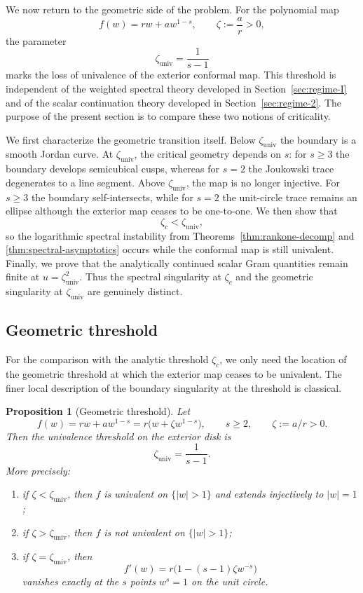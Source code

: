 \documentclass[11pt]{amsart}
\numberwithin{equation}{section}
\theoremstyle{plain}
\newtheorem{proposition}[theorem]{Proposition}
\theoremstyle{definition}
\theoremstyle{remark}
\begin{document}

We now return to the geometric side of the problem. For the polynomial map
\[
	f(w)=rw+aw^{1-s},
	\qquad
	\zeta:=\frac{a}{r}>0,
\]
the parameter
\[
	\zeta_{\mathrm{univ}}=\frac{1}{s-1}
\]
marks the loss of univalence of the exterior conformal map. This threshold
is independent of the weighted spectral theory developed in
Section~\ref{sec:regime-I} and of the scalar continuation theory developed in
Section~\ref{sec:regime-2}. The purpose of the present section is to compare
these two notions of criticality.

We first characterize the geometric transition itself. Below
\(\zeta_{\mathrm{univ}}\) the boundary is a smooth Jordan curve. At
\(\zeta_{\mathrm{univ}}\), the critical geometry depends on \(s\): for
\(s\ge3\) the boundary develops semicubical cusps, whereas for \(s=2\) the
Joukowski trace degenerates to a line segment. Above
\(\zeta_{\mathrm{univ}}\), the map is no longer injective. For \(s\ge3\) the
boundary self-intersects, while for \(s=2\) the unit-circle trace remains an
ellipse although the exterior map ceases to be one-to-one. We then show that
\[
	\zeta_c<\zeta_{\mathrm{univ}},
\]
so the logarithmic spectral instability from
Theorems~\ref{thm:rankone-decomp} and
\ref{thm:spectral-asymptotics} occurs while the conformal map is still
univalent. Finally, we prove that the analytically continued scalar Gram quantities
remain finite at \(u=\zeta_{\mathrm{univ}}^2\). Thus the spectral
singularity at \(\zeta_c\) and the geometric singularity at
\(\zeta_{\mathrm{univ}}\) are genuinely distinct.

\subsection{Geometric threshold}
\label{subsec:univ-geom}

For the comparison with the analytic threshold \(\zeta_c\), we only need the
location of the geometric threshold at which the exterior map ceases to be
univalent. The finer local description of the boundary singularity at the
threshold is classical.

\begin{proposition}[Geometric threshold]
	\label{prop:univ-threshold}
	Let
	\[
		f(w)=rw+aw^{1-s}=r\bigl(w+\zeta w^{1-s}\bigr),
		\qquad s\ge2,\qquad \zeta:=a/r>0.
	\]
	Then the univalence threshold on the exterior disk is
	\[
		\zeta_{\mathrm{univ}}=\frac{1}{s-1}.
	\]
	More precisely:
	\begin{enumerate}
		\item if \(\zeta<\zeta_{\mathrm{univ}}\), then \(f\) is univalent on
		      \(\{|w|>1\}\) and extends injectively to \(|w|=1\);
		\item if \(\zeta>\zeta_{\mathrm{univ}}\), then \(f\) is not univalent on
		      \(\{|w|>1\}\);
		\item if \(\zeta=\zeta_{\mathrm{univ}}\), then
		      \[
			      f'(w)=r\bigl(1-(s-1)\zeta w^{-s}\bigr)
		      \]
		      vanishes exactly at the \(s\) points \(w^s=1\) on the unit circle.
	\end{enumerate}
\end{proposition}
\end{document}
